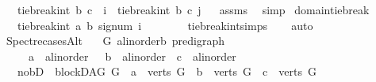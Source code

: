 \begin{isabellebody}
\ \ \ {\isachardoublequoteopen}tie{\isacharunderscore}{\kern0pt}break{\isacharunderscore}{\kern0pt}int\ b\ c\ \ i\ {\isasymle}\ tie{\isacharunderscore}{\kern0pt}break{\isacharunderscore}{\kern0pt}int\ b\ c\ j{\isachardoublequoteclose}%
\isadelimproof
\ %
\endisadelimproof
%
\isatagproof
{}\isamarkupfalse%
\ assms\ \isamarkupfalse%
\ simp%
\endisatagproof
{\isafoldproof}%
%
\isadelimproof
%
\endisadelimproof
\isanewline
\isanewline
{}\isamarkupfalse%
\ domain{\isacharunderscore}{\kern0pt}tie{\isacharunderscore}{\kern0pt}break{\isacharcolon}{\kern0pt}\isanewline
\ \ \ {\isachardoublequoteopen}tie{\isacharunderscore}{\kern0pt}break{\isacharunderscore}{\kern0pt}int\ a\ b\ {\isacharparenleft}{\kern0pt}signum\ i{\isacharparenright}{\kern0pt}\ {\isasymin}\ {\isacharbraceleft}{\kern0pt}{\isacharminus}{\kern0pt}{}\ {\isacharcomma}{\kern0pt}{}{\isacharbraceright}{\kern0pt}{\isachardoublequoteclose}\isanewline
%
\isadelimproof
\ \ %
\endisadelimproof
%
\isatagproof
{}\isamarkupfalse%
\ \ tie{\isacharunderscore}{\kern0pt}break{\isacharunderscore}{\kern0pt}int{\isachardot}{\kern0pt}simps\isanewline
\ \ \isamarkupfalse%
\ auto%
\endisatagproof
{\isafoldproof}%
%
\isadelimproof
\ \isanewline
%
\endisadelimproof
\isanewline
\isanewline
\isanewline
{}\isamarkupfalse%
\ Spectre{\isacharunderscore}{\kern0pt}casesAlt{\isacharcolon}{\kern0pt}\isanewline
\ \ \ G{\isacharcolon}{\kern0pt}{\isacharcolon}{\kern0pt}\ {\isachardoublequoteopen}{\isacharparenleft}{\kern0pt}{\isacharprime}{\kern0pt}a{\isacharcolon}{\kern0pt}{\isacharcolon}{\kern0pt}linorder{\isacharcomma}{\kern0pt}{\isacharprime}{\kern0pt}b{\isacharparenright}{\kern0pt}\ pre{\isacharunderscore}{\kern0pt}digraph{\isachardoublequoteclose}\isanewline
\ \ \ \ \ a\ {\isacharcolon}{\kern0pt}{\isacharcolon}{\kern0pt}\ {\isachardoublequoteopen}{\isacharprime}{\kern0pt}a{\isacharcolon}{\kern0pt}{\isacharcolon}{\kern0pt}linorder{\isachardoublequoteclose}\ \ \ b\ {\isacharcolon}{\kern0pt}{\isacharcolon}{\kern0pt}\ {\isachardoublequoteopen}{\isacharprime}{\kern0pt}a{\isacharcolon}{\kern0pt}{\isacharcolon}{\kern0pt}linorder{\isachardoublequoteclose}\ \ c\ {\isacharcolon}{\kern0pt}{\isacharcolon}{\kern0pt}\ {\isachardoublequoteopen}{\isacharprime}{\kern0pt}a{\isacharcolon}{\kern0pt}{\isacharcolon}{\kern0pt}linorder{\isachardoublequoteclose}\isanewline
\ \ \ {\isacharparenleft}{\kern0pt}no{\isacharunderscore}{\kern0pt}bD{\isacharparenright}{\kern0pt}\ {\isachardoublequoteopen}{\isacharparenleft}{\kern0pt}{\isasymnot}\ blockDAG\ G\ {\isasymor}\ a\ {\isasymnotin}\ verts\ G\ {\isasymor}\ b\ {\isasymnotin}\ verts\ G\ {\isasymor}\ c\ {\isasymnotin}\ verts\ G{\isacharparenright}{\kern0pt}{\isachardoublequoteclose}\isanewline

\end{isabellebody}

